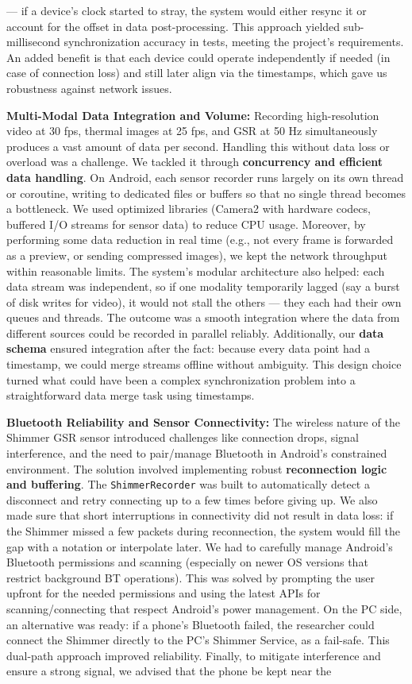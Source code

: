 --- if a device's clock started to stray, the system would either resync it or account for the offset in data post-processing. This approach yielded sub-millisecond synchronization accuracy in tests, meeting the project's requirements. An added benefit is that each device could operate independently if needed (in case of connection loss) and still later align via the timestamps, which gave us robustness against network issues. \item \textbf{Multi-Modal Data Integration and Volume:} Recording high-resolution video at 30 fps, thermal images at 25 fps, and GSR at 50 Hz simultaneously produces a vast amount of data per second. Handling this without data loss or overload was a challenge. We tackled it through \textbf{concurrency and efficient data handling}. On Android, each sensor recorder runs largely on its own thread or coroutine, writing to dedicated files or buffers so that no single thread becomes a bottleneck. We used optimized libraries (Camera2 with hardware codecs, buffered I/O streams for sensor data) to reduce CPU usage. Moreover, by performing some data reduction in real time (e.g., not every frame is forwarded as a preview, or sending compressed images), we kept the network throughput within reasonable limits. The system's modular architecture also helped: each data stream was independent, so if one modality temporarily lagged (say a burst of disk writes for video), it would not stall the others --- they each had their own queues and threads. The outcome was a smooth integration where the data from different sources could be recorded in parallel reliably. Additionally, our \textbf{data schema} ensured integration after the fact: because every data point had a timestamp, we could merge streams offline without ambiguity. This design choice turned what could have been a complex synchronization problem into a straightforward data merge task using timestamps. \item \textbf{Bluetooth Reliability and Sensor Connectivity:} The wireless nature of the Shimmer GSR sensor introduced challenges like connection drops, signal interference, and the need to pair/manage Bluetooth in Android's constrained environment. The solution involved implementing robust \textbf{reconnection logic and buffering}. The \texttt{ShimmerRecorder} was built to automatically detect a disconnect and retry connecting up to a few times before giving up. We also made sure that short interruptions in connectivity did not result in data loss: if the Shimmer missed a few packets during reconnection, the system would fill the gap with a notation or interpolate later. We had to carefully manage Android's Bluetooth permissions and scanning (especially on newer OS versions that restrict background BT operations). This was solved by prompting the user upfront for the needed permissions and using the latest APIs for scanning/connecting that respect Android's power management. On the PC side, an alternative was ready: if a phone's Bluetooth failed, the researcher could connect the Shimmer directly to the PC's Shimmer Service, as a fail-safe. This dual-path approach improved reliability. Finally, to mitigate interference and ensure a strong signal, we advised that the phone be kept near the 